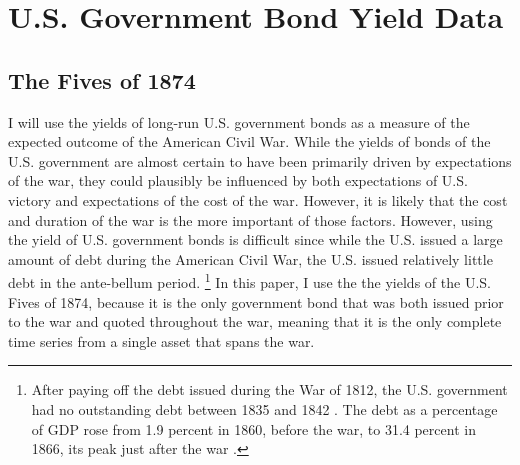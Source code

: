 \section{U.S. Government Bond Yield Data}
\label{sec:why-prices-study}



\subsection{The Fives of 1874}
\label{sec:5s-1874}

I will use the yields of long-run U.S. government bonds as a measure of the expected outcome of the American Civil War.
While the yields of bonds of the U.S. government are almost certain to have been primarily driven by expectations of the war, they could plausibly be influenced by both expectations of U.S. victory and expectations of the cost of the war.
However, it is likely that the cost and duration of the war is the more important of those factors.
However, using the yield of U.S. government bonds is difficult since while the U.S. issued a large amount of debt during the American Civil War, the U.S. issued relatively little debt in the ante-bellum period.%
\footnote{
  After paying off the debt issued during the War of 1812, the U.S. government had no outstanding debt between 1835 and 1842 \parencite[297]{HomerSylla2005}.
  The debt as a percentage of GDP rose from 1.9 percent in 1860, before the war, to 31.4 percent in 1866, its peak just after the war \parencites{CBO2012}{CBO2012a}.
}
In this paper, I use the the yields of the U.S. Fives of 1874, because it is the only government bond that was both issued prior to the war and quoted throughout the war, meaning that it is the only complete time series from a single asset that spans the war.

